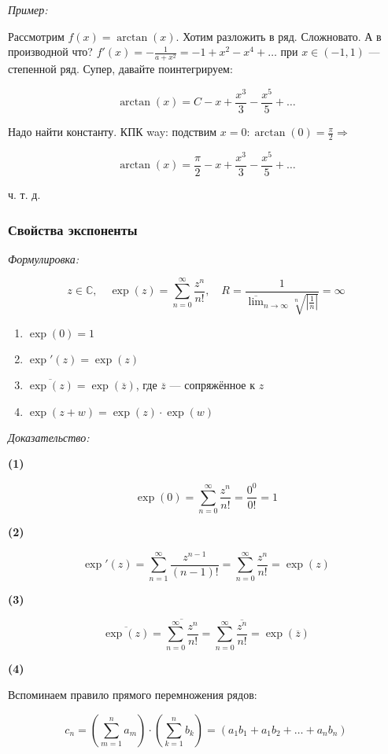 \documentclass{article}
\begin{document}
\textit{Пример:}

Рассмотрим $f(x) = \arctan(x)$. Хотим разложить в ряд. Сложновато. А в производной что? $f'(x) = -\frac{1}{a + x^2} = -1 + x^2 - x^4 + \ldots$ при $x \in (-1, 1)$ --- степенной ряд. Супер, давайте поинтегрируем: 

\[\arctan(x) = C - x + \frac{x^3}{3} - \frac{x^5}{5} + \ldots\]

Надо найти константу. КПК way: подствим $x = 0: \arctan(0) = \frac{\pi}{2} \Rightarrow$

\[\arctan(x) = \frac{\pi}{2} - x + \frac{x^3}{3} - \frac{x^5}{5} + \ldots\]

ч. т. д.

\subsubsection{Свойства экспоненты}
\textit{Формулировка:}

\[z \in \mathbb{C}, \quad \exp(z) = \sum_{n = 0}^{\infty} \frac{z^n}{n!}, \quad R = \frac{1}{\overline{\lim}_{n \rightarrow \infty}\sqrt[n]{\left|\frac{1}{n}\right|}} = \infty\]

\begin{enumerate}
    \item $\exp(0) = 1$
    \item $\exp'(z) = \exp(z)$
    \item $\overline{\exp(z)} = \exp(\overline{z})$, где $\overline{z}$ --- сопряжённое к $z$
    \item $\exp(z + w) = \exp(z) \cdot \exp(w)$
\end{enumerate}

\textit{Доказательство:}

\textbf{(1)}

\[\exp(0) = \sum_{n = 0}^{\infty} \frac{z^n}{n!} = \frac{0^0}{0!} = 1\]

\textbf{(2)}

\[\exp'(z) = \sum_{n = 1}^{\infty} \frac{z^{n - 1}}{(n - 1)!} = \sum_{n = 0}^{\infty} \frac{z^n}{n!} = \exp(z)\]

\textbf{(3)}

\[\overline{\exp(z)} = \overline{\sum_{n = 0}^{\infty} \frac{z^n}{n!}} = \sum_{n = 0}^{\infty} \frac{\overline{z^n}}{n!} = \exp(\overline{z})\]

\textbf{(4)}

Вспоминаем правило прямого перемножения рядов:

\[c_n = \left(\sum_{m = 1}^{n} a_m \right) \cdot \left(\sum_{k = 1}^{n} b_k \right) = (a_1b_1 + a_1b_2 + \ldots + a_nb_n)\]
\end{document}
